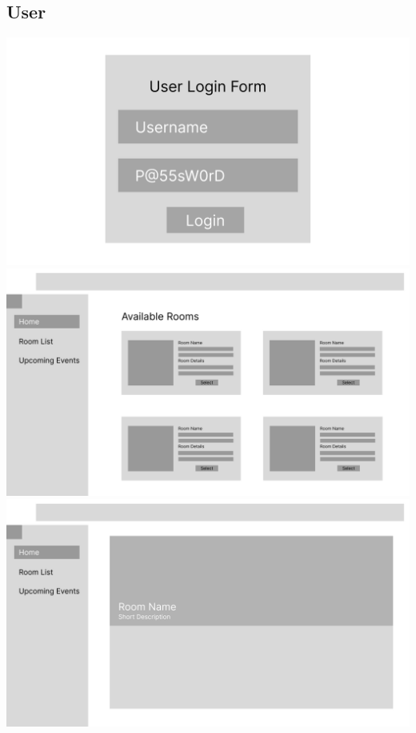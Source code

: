 \documentclass[12pt,titlepage,a4paper]{report}
\begin{document}
    \subsection{User}
    \begin{center}
        \includegraphics[width=\textwidth]{images/figures/UIUX/Login_Page_(Atmin).png}\\
        \includegraphics[width=\textwidth]{images/figures/UIUX/Room_Borrowing_Page_(User).png}\\
        \includegraphics[width=\textwidth]{images/figures/UIUX/Room_Description_(User).png}\\

\end{center}
\end{document}
